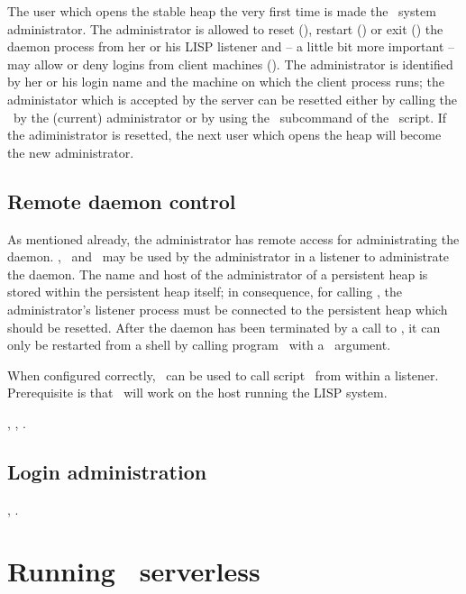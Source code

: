 The user which opens the stable heap the very first time is made the
\plob\ system administrator. The administrator is allowed to reset
(), restart () or exit
() the daemon process from her or his LISP listener and
-- a little bit more important -- may allow or deny logins from client
machines (). The administrator is
identified by her or his login name and the machine on which the
client process runs; the administator which is accepted by the server
can be resetted either by calling the \ by the
(current) administrator or by using the \ subcommand of
the \ script. If the adiministrator is resetted, the
next user which opens the heap will become the new administrator.

\subsection{Remote daemon control}%
\label{sec:RemoteDaemonControl}

As mentioned already, the administrator has remote access for
administrating the daemon. , \ and
\ may be used by the administrator in a listener to
administrate the daemon. The name and host of the administrator of a
persistent heap is stored within the persistent heap itself; in
consequence, for calling , the administrator's listener
process must be connected to the persistent heap which should be
resetted. After the daemon has been terminated by a call to
, it can only be restarted from a shell by calling
program \ with a \ argument.

When configured correctly, \ can be used to call
script \ from within a listener. Prerequisite is that
\ will work on the host running the LISP system.

 {}, , .

\subsection{Login administration}

 {}, .

\section[Serverless PLOB]{Running \protect\plob\ serverless}

